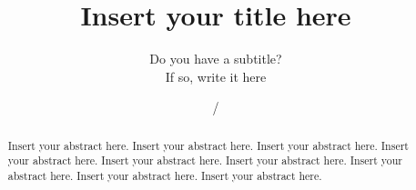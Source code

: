 \documentclass[fist]{svjour3}
\begin{document}
\title{Insert your title here%
}


\subtitle{Do you have a subtitle?\\ If so, write it here}

\author{     %
       \and
}

           

\date{ / }

\maketitle

\begin{abstract}
Insert your abstract here. Insert your abstract here. Insert your abstract here.
Insert your abstract here. Insert your abstract here. Insert your abstract here.
Insert your abstract here. Insert your abstract here. Insert your abstract here.



\end{abstract}
\end{document}
